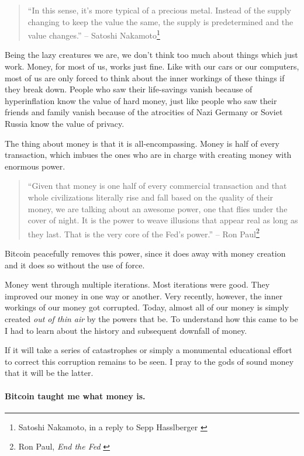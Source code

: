 \begin{samepage}\begin{quotation}
\enquote{In this sense, it's more typical of a precious metal. Instead of the
supply changing to keep the value the same, the supply is
predetermined and the value changes.}
\flushright -- Satoshi Nakamoto\footnote{Satoshi Nakamoto, in a reply to Sepp
Hasslberger \cite{satoshi-precious-metal}}
\end{quotation}\end{samepage}

Being the lazy creatures we are, we don't think too much about things
which just work. Money, for most of us, works just fine. Like with our
cars or our computers, most of us are only forced to think about the
inner workings of these things if they break down. People who saw their
life-savings vanish because of hyperinflation know the value of hard
money, just like people who saw their friends and family vanish because
of the atrocities of Nazi Germany or Soviet Russia know the value of
privacy.

The thing about money is that it is all-encompassing. Money is half of
every transaction, which imbues the ones who are in charge with creating
money with enormous power.

\begin{samepage}\begin{quotation}
\enquote{Given that money is one half of every commercial transaction and that
whole civilizations literally rise and fall based on the quality of
their money, we are talking about an awesome power, one that flies
under the cover of night. It is the power to weave illusions that
appear real as long as they last. That is the very core of the
Fed's power.}
\flushright -- Ron Paul\footnote{Ron Paul, \textit{End the Fed} \cite{end-the-fed}}
\end{quotation}\end{samepage}

Bitcoin peacefully removes this power, since it does away with money
creation and it does so without the use of force.

Money went through multiple iterations. Most iterations were good. They
improved our money in one way or another. Very recently, however, the
inner workings of our money got corrupted. Today, almost all of our
money is simply created \textit{out of thin air} by the powers that be. To
understand how this came to be I had to learn about the history and
subsequent downfall of money.

If it will take a series of catastrophes or simply a monumental
educational effort to correct this corruption remains to be seen. I pray
to the gods of sound money that it will be the latter.

\paragraph{Bitcoin taught me what money is.}

%
%
%
%
